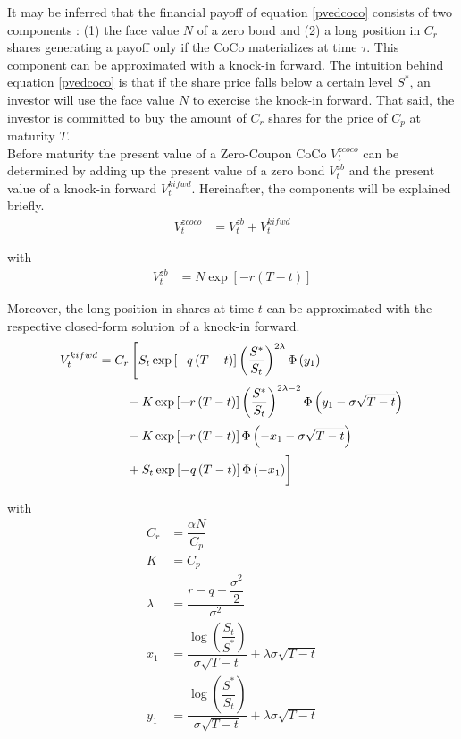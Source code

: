 It may be inferred that the financial payoff of equation \ref{pvedcoco} consists of two components \citep{erismann2015pricing}: (1) the face value $N$ of a zero bond and (2) a long position in $C_r$ shares generating a payoff only if the CoCo materializes at time $\tau$. This component can be approximated with a knock-in forward. The intuition behind equation \ref{pvedcoco} is that if the share price falls below a certain level $S^*$, an investor will use the face value $N$ to exercise the knock-in forward. That said, the investor is committed to buy the amount of $C_r$ shares for the price of $C_p$ at maturity $T$.\\

Before maturity the present value of a Zero-Coupon CoCo $V^{zcoco}_t$ can be determined by adding up the present value of a zero bond $V^{zb}_t$ and the present value of a knock-in forward $V_t^{kifwd}$. Hereinafter, the components will be explained briefly. 
\begin{align} \label{pvzcoco}
V^{zcoco}_t &= V^{zb}_t + V_t^{kifwd}
\end{align}

with
\begin{align} 
V^{zb}_t &= N \exp\left[- r (T - t)\right]
\end{align}

Moreover, the long position in shares at time $t$ can be approximated with the respective closed-form solution of a knock-in forward. \citep{hull2006options} 
\begin{align}
    V_t^{kifwd} &= C_r \left[ S_t \exp\left[- q \left(T-t\right)\right]\left(\dfrac{S^*}{S_t}\right)^{2 \lambda} \Phi\left(y_1\right) \right.\nonumber\\
   &\qquad \left.\vphantom{\dfrac{S^*}{S_t}} - K \exp\left[- r \left(T-t\right)\right] \left(\dfrac{S^*}{S_t}\right)^{2 \lambda - 2} \Phi\left(y_1 - \sigma \sqrt{T-t}\right) \right.\nonumber\\
   &\qquad \left.\vphantom{\dfrac{S^*}{S_t}} - K \exp\left[- r \left(T-t\right)\right] \Phi\left(-x_1 - \sigma \sqrt{T-t}\right) \right.\nonumber\\
   &\qquad \left.\vphantom{\dfrac{S^*}{S_t}} + S_t \exp\left[- q \left(T-t\right)\right] \Phi\left(- x_1\right) \right] 
\end{align}

with 
\begin{align*}
C_r &= \dfrac{\alpha N}{C_p}\\
K &= C_p\\
\lambda &= \dfrac{r-q+\dfrac{\sigma^2}{2}}{\sigma^2}\\
x_1 &= \dfrac{\log\left(\dfrac{S_t}{S^*} \right)}{\sigma \sqrt{T-t}} + \lambda \sigma \sqrt{T-t}\\
y_1 &= \dfrac{\log\left(\dfrac{S^*}{S_t} \right)}{\sigma \sqrt{T-t}} + \lambda \sigma \sqrt{T-t}\\
\end{align*}


